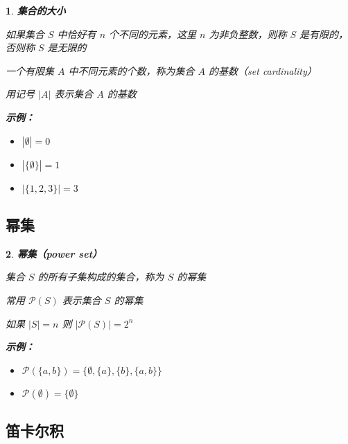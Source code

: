 \documentclass[UTF8]{report}
\theoremstyle{MyLineTheoremStyle} %
\theoremstyle{MyBlockTheoremStyle} %
\theoremstyle{MySubsubsectionStyle} %
\newtheorem{definition}{}
\begin{document}
\begin{definition}
    \textbf{集合的大小}\par
    如果集合 $S$ 中恰好有 $n$ 个不同的元素，这里 $n$ 为非负整数，则称 $S$ 是有限的，否则称 $S$ 是无限的\par
    一个有限集 $A$ 中不同元素的个数，称为集合 $A$ 的基数（set cardinality）\par
    用记号 $|A|$ 表示集合 $A$ 的基数\par

    \textbf{示例：}\par
    \begin{itemize}
        \item $|\emptyset| = 0$
        \item $|\{\emptyset\}| = 1$
        \item $|\{1, 2, 3\}| = 3$
    \end{itemize}
\end{definition}

\subsection{幂集}

\begin{definition}
    \textbf{幂集（power set）}\par
    集合 $S$ 的所有子集构成的集合，称为 $S$ 的幂集\par
    常用 $\mathcal{P}(S)$ 表示集合 $S$ 的幂集\par
    如果 $|S| = n$ 则 $|\mathcal{P}(S)| = 2^n$\par

    \textbf{示例：}\par
    \begin{itemize}
        \item $\mathcal{P}(\{a, b\}) = \{\emptyset, \{a\}, \{b\}, \{a, b\}\}$
        \item $\mathcal{P}(\emptyset) = \{\emptyset\}$
    \end{itemize}
\end{definition}

\subsection{笛卡尔积}
\end{document}
